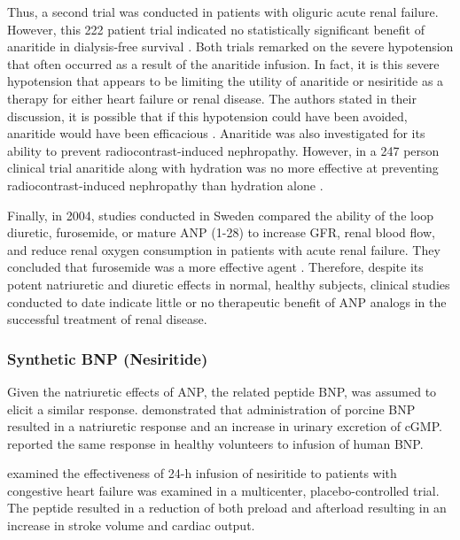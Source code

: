\documentclass[14pt,a4paper,onecolumn]{extarticle}
\begin{document}
Thus, a second trial was conducted in patients with oliguric acute renal failure. However, this 222 patient trial indicated no statistically significant benefit of anaritide in dialysis-free survival \citep{Lewis2000}. Both trials remarked on the severe hypotension that often occurred as a result of the anaritide infusion. In fact, it is this severe hypotension that appears to be limiting the utility of anaritide or nesiritide as a therapy for either heart failure or renal disease. The authors stated in their discussion, it is possible that if this hypotension could have been avoided, anaritide would have been efficacious \citep{Lewis2000}.  Anaritide was also investigated for its ability to prevent radiocontrast-induced nephropathy. However, in a 247 person clinical trial anaritide along with hydration was no more effective at preventing radiocontrast-induced nephropathy than hydration alone \citep{Kurnik1998}.



Finally, in 2004, studies conducted in Sweden compared the ability of the loop diuretic, furosemide, or mature ANP (1-28) to increase GFR, renal blood flow, and reduce renal oxygen consumption in patients with acute renal failure. They concluded that furosemide was a more effective agent \citep{Sward2005}. Therefore, despite its potent natriuretic and diuretic effects in normal, healthy subjects, clinical studies conducted to date indicate little or no therapeutic benefit of ANP analogs in the successful treatment of renal disease.



\subsubsection{Synthetic BNP (Nesiritide)}

Given the natriuretic effects of ANP, the related peptide BNP, was assumed to elicit a similar response.  \citep{McGregor1990} demonstrated that administration of porcine BNP resulted in a natriuretic response and an increase in urinary excretion of cGMP. \citep{Yoshimura1991} reported the same response in healthy volunteers to infusion of human BNP.



\citep{Mills1999} examined the effectiveness of 24-h infusion of nesiritide to patients with congestive heart failure was examined in a multicenter, placebo-controlled trial. The peptide resulted in a reduction of both preload and afterload resulting in an increase in stroke volume and cardiac output.
\end{document}
